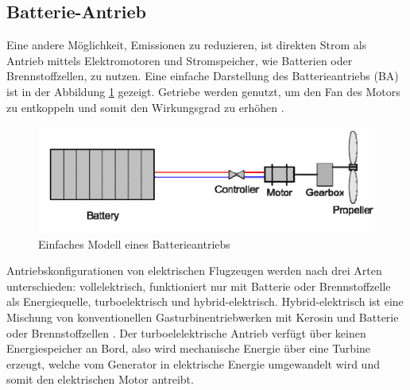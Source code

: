 \subsection{Batterie-Antrieb}
Eine andere Möglichkeit, Emissionen zu reduzieren, ist direkten Strom als Antrieb 
mittels Elektromotoren und Stromspeicher, wie Batterien oder Brennstoffzellen, zu nutzen.
Eine einfache Darstellung des Batterieantriebs (BA) ist in der Abbildung \ref{ba} gezeigt. 
Getriebe werden genutzt, um den Fan des Motors zu entkoppeln und somit den Wirkungsgrad zu erhöhen \cite{hepperle2012electric}.
%
\begin{figure}[h]
	\centering
	\includegraphics[width=0.7\linewidth]{Bilder/BA.png}
	\caption[Einfaches Modell eines Batterieantriebs]{Einfaches Modell eines Batterieantriebs \cite{hepperle2012electric}}
	\label{ba}
\end{figure}

Antriebskonfigurationen von elektrischen Flugzeugen werden nach drei Arten unterschieden: 
vollelektrisch, funktioniert nur mit Batterie oder Brennstoffzelle als Energiequelle, 
turboelektrisch und hybrid-elektrisch. 
Hybrid-elektrisch ist eine Mischung von konventionellen Gasturbinentriebwerken mit Kerosin 
und Batterie oder Brennstoffzellen \cite{dahal2021techno}. 
Der turboelelektrische Antrieb verfügt über keinen Energiespeicher an Bord, 
also wird mechanische Energie über eine Turbine erzeugt, welche vom Generator in elektrische Energie 
umgewandelt wird und somit den elektrischen Motor antreibt. %

